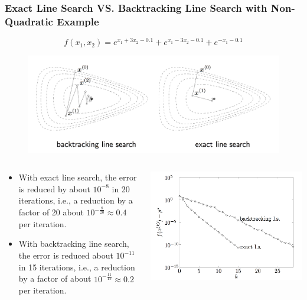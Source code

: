 \begin{frame}
  \frametitle{Exact Line Search VS.  Backtracking Line Search with
    Non-Quadratic Example}
$$f(x_1, x_2) = e^{x_1+3x_2-0.1} + e^{x_1-3x_2-0.1} + e^{-x_1-0.1}$$

\begin{figure}
\centering
\includegraphics[scale=0.25]{pics/btes.png}
\end{figure}



\begin{columns}
  \begin{column}{0.6\textwidth}
{\tiny
    \begin{itemize}
    \item With exact line search, the error is reduced by about $10^{-8}$
      in 20 iterations, i.e., a reduction by a factor of
20 about $10^{-\frac{8}{20}} \approx 0.4$ per iteration.
\item With backtracking line search, the error is reduced
about $10^{-11}$ in 15 iterations, i.e., a reduction by a factor of
 about $10^{-\frac{11}{15}} \approx 0.2$ per iteration.
    \end{itemize}
}
  \end{column}

\begin{column}{0.5\textwidth}
\includegraphics[scale = 0.12]{pics/els.png}

\end{column}

\end{columns}
\end{frame}


